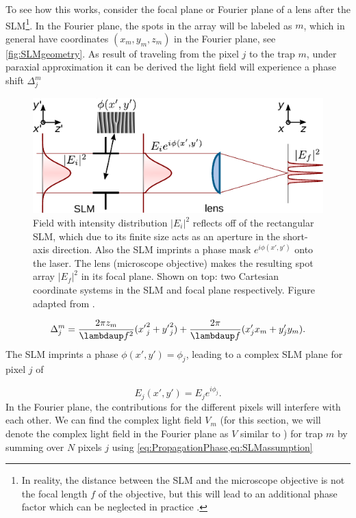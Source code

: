 To see how this works, consider the focal plane or Fourier plane of a lens after the SLM\footnote{In reality, the distance between the SLM and the microscope objective is not the focal length $f$ of the objective, but this will lead to an additional phase factor which can be neglected in practice \cite{Bijnen2013}.}.
In the Fourier plane, the spots in the array will be labeled as $m$, which in general have coordinates $(x_m, y_m, z_m)$ in the Fourier plane, see \cref{fig:SLMgeometry}.
As result of traveling from the pixel $j$ to the trap $m$, under paraxial approximation it can be derived the light field will experience a phase shift $\Delta_j^m$ \cite{DiLeonardo2007}

\begin{figure}
	\centering
	\includegraphics[width = 13cm]{figures/SLMfigure.pdf}
	\caption{Field with intensity distribution $|E_i|^2$ reflects off of the   rectangular SLM, which due to its finite size acts as an aperture in the short-axis direction.
	Also the SLM imprints a phase mask $e^{i\phi(x',y')}$ onto the laser.
	The lens (microscope objective) makes the resulting spot array $|E_f|^2$ in its focal plane.
	Shown on top: two Cartesian coordinate systems in the SLM and focal plane respectively. 
	Figure adapted from \cite{Labuhn2016}.}
	\label{fig:SLMLens}
\end{figure}

\begin{equation}\label{eq:PropagationPhase}
    \Delta_j^m = 
    \frac{2\pi z_m}{\lambdaup f^2} ({x'}_{j}^{2} + {y'}_{j}^{2}) 
    + \frac{2\pi}{\lambdaup f}(x'_j x_m + y'_j y_m).
\end{equation}
The SLM imprints a phase $\phi(x',y') = \phi_j$, leading to a complex SLM plane for pixel $j$ of

\begin{equation}\label{eq:SLMassumption}
    E_j(x',y') = E_j e^{i \phi_j}.
\end{equation}
In the Fourier plane, the contributions for the different pixels will interfere with each other.
We can find the complex light field $V_m$ (for this section, we will denote the complex light field in the Fourier plane as $V$ similar to \cite{DiLeonardo2007}) for trap $m$ by summing over $N$ pixels $j$ using \cref{eq:PropagationPhase,eq:SLMassumption} \cite{Leseleuc2018}

